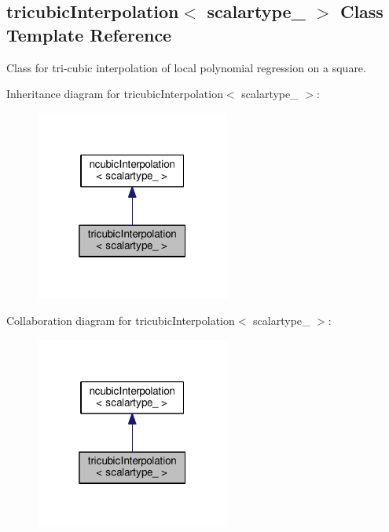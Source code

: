 \hypertarget{classtricubicInterpolation}{}\subsection{tricubic\+Interpolation$<$ scalartype\+\_\+ $>$ Class Template Reference}
\label{classtricubicInterpolation}


Class for tri-\/cubic interpolation of local polynomial regression on a square.  




Inheritance diagram for tricubic\+Interpolation$<$ scalartype\+\_\+ $>$\+:\nopagebreak
\begin{figure}[H]
\begin{center}
\leavevmode
\includegraphics[width=181pt]{classtricubicInterpolation__inherit__graph}
\end{center}
\end{figure}


Collaboration diagram for tricubic\+Interpolation$<$ scalartype\+\_\+ $>$\+:\nopagebreak
\begin{figure}[H]
\begin{center}
\leavevmode
\includegraphics[width=181pt]{classtricubicInterpolation__coll__graph}
\end{center}
\end{figure}
